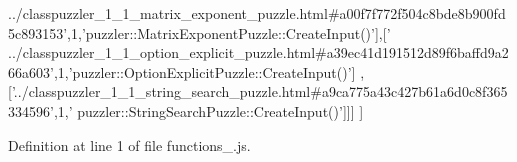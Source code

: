 \begin{DoxyCode}
{      ../classpuzzler\_1\_1\_matrix\_exponent\_puzzle.html#a00f7f772f504c8bde8b900fd5c893153'},1,\textcolor{stringliteral}{'puzzler::MatrixExponentPuzzle::CreateInput()'}],[\textcolor{stringliteral}{'
      ../classpuzzler\_1\_1\_option\_explicit\_puzzle.html#a39ec41d191512d89f6baffd9a266a603'},1,\textcolor{stringliteral}{'puzzler::OptionExplicitPuzzle::CreateInput()'}]
      ,[\textcolor{stringliteral}{'../classpuzzler\_1\_1\_string\_search\_puzzle.html#a9ca775a43c427b61a6d0c8f365334596'},1,\textcolor{stringliteral}{'
      puzzler::StringSearchPuzzle::CreateInput()'}]]]
]
\end{DoxyCode}


Definition at line 1 of file functions\+\_.\+js.

